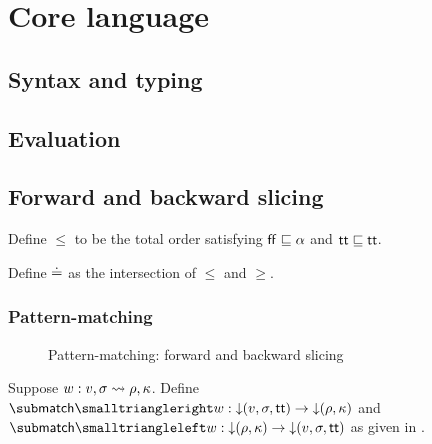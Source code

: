 \section{Core language}

\subsection{Syntax and typing}







\subsection{Evaluation}




\subsection{Forward and backward slicing}



\begin{definition}
   Define $\leq$ to be the total order satisfying $\mathsf{ff} \sqsubseteq \alpha$ and $\mathsf{tt} \sqsubseteq \mathsf{tt}$.
\end{definition}

\begin{definition}
   Define $\doteq$ as the intersection of $\leq$ and $\geq$.
\end{definition}




\subsubsection{Pattern-matching}

\begin{figure}[H]
   \small
   
   \caption{Pattern-matching: forward and backward slicing}
   \label{fig:match:fwd-bwd}
\end{figure}

\begin{definition}
   Suppose $w: v, \sigma \rightsquigarrow \rho, \kappa$. Define $\matchFwdF{w}: \Below{(v,\sigma,\TT)} \to \Below{(\rho,\kappa)}$ and $\matchBwdF{w}: \Below{(\rho,\kappa)} \to \Below{(v,\sigma,\TT)}$ as given in .
\end{definition}


